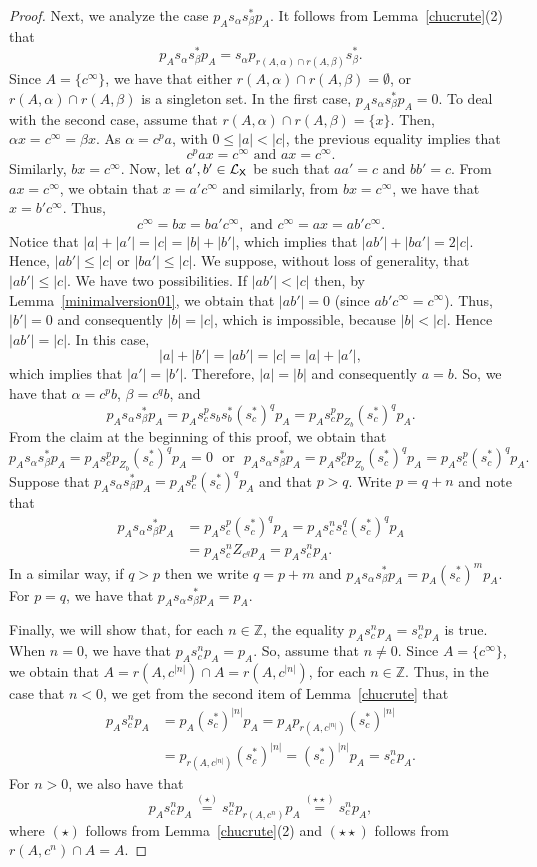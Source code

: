 \documentclass[a4paper,12pt]{amsart}
\theoremstyle{definition}
\theoremstyle{remark}
\numberwithin{equation}{section}
\newcommand{\osf}{{\normalfont \textsf{X}}}
\newcommand{\lang}{\CL_{\osf}}
\newcommand{\Z}{\mathbb{Z}}
\newcommand{\CL}{\mathcal{L}}
\begin{document}
\begin{proof}
Next, we analyze the case $p_As_\alpha s_\beta^* p_A$. It follows from Lemma~\ref{chucrute}(2) that 
$$p_As_\alpha s_\beta^* p_A=s_\alpha p_{r(A,\alpha)\cap r(A,\beta)}s_\beta^*.$$ Since $A=\{c^\infty\}$, we have that either $r(A,\alpha)\cap r(A,\beta)=\emptyset$,  or $r(A,\alpha)\cap r(A,\beta)$ is a singleton set. In the first case, $p_As_\alpha s_\beta^*p_A=0$. To deal with the second case, assume that $r(A,\alpha)\cap r(A,\beta)=\{x\}$. 
Then, $\alpha x=c^\infty=\beta x$. As $\alpha =c^p a$, with $0\leq |a|<|c|$, the previous equality implies that 
$$c^p a x=c^\infty \text{ and } ax=c^\infty.$$
Similarly, $bx=c^\infty$. Now, let $a',b'\in \lang$ be such that $aa'=c$ and $bb'=c$. From $ax=c^\infty$, we obtain that $x=a'c^\infty$ and similarly, from $bx=c^\infty$, we have that $x=b'c^\infty$. Thus,
$$c^\infty=bx=ba' c^\infty, \text{ and } c^\infty=ax=ab'c^\infty.$$
Notice that $|a|+|a'|=|c|=|b|+|b'|$, which implies that $|ab'|+|ba'|=2|c|$. Hence, $|ab'|\leq |c|$ or $|ba'|\leq |c|$. We suppose, without loss of generality, that $|ab'|\leq |c|$. We have two possibilities. If $|ab'|<|c|$ then, by Lemma~\ref{minimalversion01}, we obtain that $|ab'|=0$ (since $ab'c^\infty=c^\infty$). Thus, $|b'|=0$ and consequently $|b|=|c|$, which is impossible, because $|b|<|c|$. Hence $|ab'|=|c|$. In this case, $$|a|+|b'|=|ab'|=|c|=|a|+|a'|,$$ 
which implies that $|a'|=|b'|$. Therefore, $|a|=|b|$ and consequently $a=b$. So, we have that  $\alpha=c^pb$, $\beta=c^qb$, and 
$$p_A s_\alpha s_\beta^*p_A=p_A s_c^ps_bs_b^*(s_c^*)^qp_A=p_A s_c^pp_{Z_b}(s_c^*)^qp_A.$$
From the claim at the beginning of this proof, we obtain that  
$$p_A s_\alpha s_\beta^*p_A=p_A s_c^pp_{Z_b}(s_c^*)^qp_A=0 \,\,\text{ or }\,\, p_A s_\alpha s_\beta^*p_A=p_A s_c^pp_{Z_b}(s_c^*)^qp_A=p_A s_c^p(s_c^*)^qp_A.$$ 
Suppose that $p_A s_\alpha s_\beta^*p_A=p_A s_c^p(s_c^*)^qp_A$ and that $p>q$. Write $p=q+n$ and note that 
\begin{align*}
    p_A s_\alpha s_\beta^*p_A&=p_A s_c^p(s_c^*)^qp_A=p_A s_c^ns_c^q (s_c^*)^qp_A\\
    &=p_A s_c^nZ_{c^q}p_A=p_As_c^np_A.
\end{align*}
In a similar way, if $q>p$ then we write $q=p+m$ and $p_A s_\alpha s_\beta^*p_A=p_A(s_c^*)^mp_A$. For $p=q$, we have that $p_A s_\alpha s_\beta^*p_A=p_A$. \smallbreak

Finally, we will show that, for each $n\in \Z$, the equality $p_A s_c^np_A=s_c^np_A$ is true. When $n=0$, we have that $p_A s_c^np_A=p_A$. So, assume that $n\neq 0$. Since $A=\{c^\infty\}$, we obtain that $A=r(A,c^{|n|})\cap A=r(A, c^{|n|})$, for each $n\in \Z$. Thus, in the case that $n<0$, we get from the second item of Lemma~\ref{chucrute} that 
\begin{align*}
    p_A s_c^n p_A&=p_A (s_c^*)^{|n|}p_A= p_A p_{r(A,c^{|n|})}(s_c^*)^{|n|}\\
    &=p_{r(A, c^{|n|})}(s_c^*)^{|n|}=(s_c^*)^{|n|}p_A=s_c^n p_A.
\end{align*}
For $n>0$, we also have that $$p_A s_c^n p_A\stackrel{(\star)}{=}s_c^n p_{r(A,c^n)}p_A\stackrel{(\star\star)}{=}s_c^n p_A,$$ where $(\star)$ follows from Lemma~\ref{chucrute}(2) and $(\star\star)$ follows from $r(A,c^n) \cap A=A$.
\end{proof}
\end{document}
